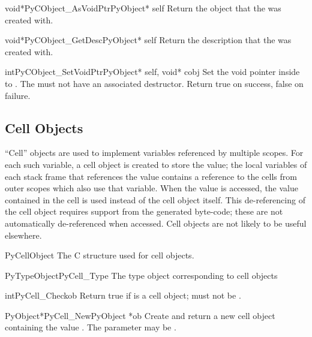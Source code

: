 \begin{cfuncdesc}{void*}{PyCObject_AsVoidPtr}{PyObject* self}
  Return the object  that the 
   was created with.
\end{cfuncdesc}

\begin{cfuncdesc}{void*}{PyCObject_GetDesc}{PyObject* self}
  Return the description  that the 
   was created with.
\end{cfuncdesc}

\begin{cfuncdesc}{int}{PyCObject_SetVoidPtr}{PyObject* self, void* cobj}
  Set the void pointer inside  to .
  The  must not have an associated destructor.
  Return true on success, false on failure.
\end{cfuncdesc}


\subsection{Cell Objects \label{cell-objects}}

``Cell'' objects are used to implement variables referenced by
multiple scopes.  For each such variable, a cell object is created to
store the value; the local variables of each stack frame that
references the value contains a reference to the cells from outer
scopes which also use that variable.  When the value is accessed, the
value contained in the cell is used instead of the cell object
itself.  This de-referencing of the cell object requires support from
the generated byte-code; these are not automatically de-referenced
when accessed.  Cell objects are not likely to be useful elsewhere.

\begin{ctypedesc}{PyCellObject}
  The C structure used for cell objects.
\end{ctypedesc}

\begin{cvardesc}{PyTypeObject}{PyCell_Type}
  The type object corresponding to cell objects
\end{cvardesc}

\begin{cfuncdesc}{int}{PyCell_Check}{ob}
  Return true if  is a cell object;  must not be
  \NULL{}.
\end{cfuncdesc}

\begin{cfuncdesc}{PyObject*}{PyCell_New}{PyObject *ob}
  Create and return a new cell object containing the value .
  The parameter may be \NULL{}.
\end{cfuncdesc}

